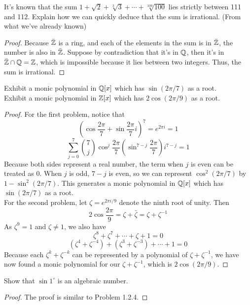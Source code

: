 \documentclass[12pt,twoside=semi,openright,numbers=noenddot]{scrbook}
\begin{document}
\begin{problem}
    It's known that the sum $1 + \sqrt{2} + \sqrt[3]{3} + \cdots + \sqrt[100]{100}$ lies strictly 
    between 111 and 112. Explain how we can quickly deduce that the sum is irrational. (From what we've already known)
\end{problem}
    \begin{proof}
        Because $\bar{\mathbb Z}$ is a ring, and each of the elements in the sum is in $\bar{\mathbb Z}$, the number is also 
        in $\bar{\mathbb Z}$. Suppose by contradiction that it's in $\mathbb Q$, then it's in $\bar{\mathbb Z} \cap \mathbb Q = \mathbb Z$, which is 
        impossible because it lies between two integers. Thus, the sum is irrational.
    \end{proof}



\begin{problem}
    Exhibit a monic polynomial in $\mathbb Q[x]$ which has $\sin(2\pi/7)$ as a root.\\
    Exhibit a monic polynomial in $\mathbb Z[x]$ which has $2\cos(2\pi/9)$ as a root.
\end{problem}

    \begin{proof}
        For the first problem, notice that 
        $$ (\cos \frac{2\pi}{7} + \sin \frac{2\pi}{7}i )^7 = e^{2\pi i} = 1$$
        $$ \sum_{j = 0}^7 \binom{7}{j} \cos^j \frac{2\pi}{7} (\sin^{7-j} \frac{2\pi}{7})i^{7-j} = 1$$
        Because both sides represent a real number, the term when $j$ is even can be treated as $0$.
        When $j$ is odd, $7-j$ is even, so we can represent $\cos^2 (2\pi/7)$ by $1-\sin^2 (2\pi/7)$.
        This generates a monic polynomial in $\mathbb Q[x]$ which has $\sin (2\pi/7)$ as a root. \\
        For the second problem, let $\zeta = e^{2\pi i/9}$ denote the ninth root of unity. Then 
        $$ 2 \cos \frac{2\pi}{9} = \zeta + \bar{\zeta} = \zeta + \zeta ^{-1}$$
        As $\zeta ^9 = 1$ and $\zeta \neq 1$, we also have
        $$ \zeta ^ 8 + \zeta ^ 7 + \cdots + \zeta + 1 = 0$$
        $$ (\zeta ^ 4 + \zeta ^{-4}) + (\zeta^3 + \zeta^{-3}) + \cdots + 1 = 0$$
        Because each $\zeta^k + \zeta^{-k}$ can be represented by a polynomial of $\zeta+ \zeta^{-1}$, we have 
        now found a monic polynomial for our $\zeta + \zeta^{-1}$, which is $2\cos (2\pi/9)$.
    \end{proof}

\begin{problem}
    Show that $\sin 1^\circ $ is an algebraic number.
\end{problem}
    \begin{proof}
        The proof is similar to Problem 1.2.4.
    \end{proof}
\end{document}
